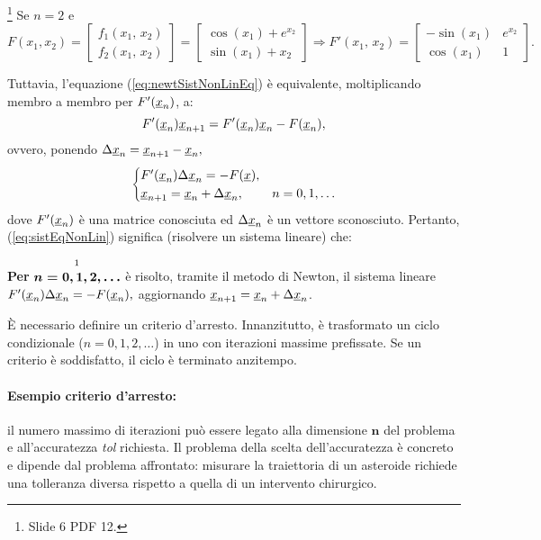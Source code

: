 \begin{example}\footnote{Slide 6 PDF 12.}
    Se $n=2$ e $F(x_1,x_2)=
    \begin{bmatrix}
        f_1(x_1,\, x_2)\\
        f_2(x_1,\, x_2)
    \end{bmatrix} = 
    \begin{bmatrix}
        \cos{(x_1)} + e^{x_2}\\
        \sin{(x_1)} + x_2
    \end{bmatrix}\Rightarrow F'(x_1,\, x_2) = \begin{bmatrix}
        -\sin{(x_1)} & e^{x_2}\\
        \cos{(x_1)} & 1
    \end{bmatrix}.$
\end{example}

Tuttavia, l'equazione (\ref{eq:newtSistNonLinEq}) è equivalente, moltiplicando membro a membro per $F'(\uline x_n)$, a:
\begin{equation*}
    F'(\uline x_n)\uline x_{n+1} = F'(\uline x_n)\uline x_n - F(\uline x_n),
\end{equation*}
ovvero, ponendo $\Delta\uline x_n = \uline x_{n+1} - \uline x_n,$
\begin{equation}\label{eq:sistEqNonLin}
    \begin{cases}
        F'(\uline x_n) \Delta\uline x_n = - F(\uline x),\\
        \uline x_{n+1} = \uline x_n + \Delta\uline x_n, & n=0,1,\hdots
    \end{cases}
\end{equation}
dove $F'(\uline x_n)$ è una matrice conosciuta ed $\Delta\uline x_n$ è un vettore sconosciuto. Pertanto, (\ref{eq:sistEqNonLin}) significa (risolvere un sistema lineare) che:

\textbf{Per} $\overset{\footnotemark}{{\boldsymbol{n=0,1,2,\hdots}}}$ è risolto, tramite il metodo di Newton, il sistema lineare $F'(\uline x_n) \Delta\uline x_n = - F(\uline x_n),$ aggiornando $\uline x_{n+1} = \uline x_n + \Delta\uline x_n$.

È necessario definire un criterio d'arresto. Innanzitutto, è trasformato un ciclo condizionale ($n=0,1,2,\hdots$) in uno con iterazioni massime prefissate. Se un criterio è soddisfatto, il ciclo è terminato anzitempo. 

\paragraph{Esempio criterio d'arresto:}{il numero massimo di iterazioni può essere legato alla dimensione $\boldsymbol n$ del problema e all'accuratezza \textit{tol} richiesta.} Il problema della scelta dell'accuratezza è concreto e dipende dal problema affrontato: misurare la traiettoria di un asteroide richiede una tolleranza diversa rispetto a quella di un intervento chirurgico. 

